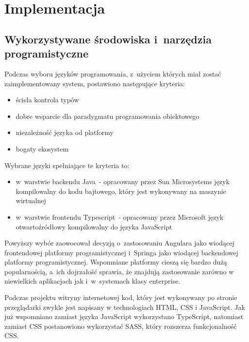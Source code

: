 \chapter{Implementacja}\label{ch:implementation}
\section{Wykorzystywane środowiska i~narzędzia programistyczne}\label{sec:dev-tools}

Podczas wyboru języków programowania, z~użyciem których miał zostać zaimplementowany system, postawiono następujące kryteria:

\begin{itemize}
    \item ścisła kontrola typów
    \item dobre wsparcie dla paradygmatu programowania obiektowego
    \item niezależność języka od platformy
    \item bogaty ekosystem
\end{itemize}

Wybrane języki spełniające te kryteria to:

\begin{itemize}
    \item w~warstwie backendu Java\cite{tech:java}~- opracowany przez Sun Microsystems język kompilowalny do kodu bajtowego, który jest wykonywany na maszynie wirtualnej
    \item w~warstwie frontendu Typescript\cite{tech:typescript}~- opracowany przez Microsoft język otwartoźródłowy kompilowalny do języka JavaScript\cite{tech:javascript}
\end{itemize}

Powyższy wybór zaowocował decyzją o~zastosowaniu Angulara\cite{tech:angular} jako wiodącej frontendowej platformy programistycznej
i~Springa\cite{tech:spring} jako wiodącej backendowej platformy programistycznej.
Wspomniane platformy cieszą się bardzo dużą popularnością, a~ich dojrzałość sprawia,
że znajdują zastosowanie zarówno w niewielkich aplikacjach jak i~w~systemach klasy enterprise.

\par
Podczas projektu witryny internetowej kod, który jest wykonywany po stronie przeglądarki zwykle jest napisany w technologiach HTML, CSS\cite{tech:html-css} i JavaScript\cite{tech:javascript}.
Jak już wspomniano zamiast języka JavaScript wykorzystano TypeScript, natomiast zamiast CSS postanowiono wykorzystać SASS\cite{tech:sass}, który rozszerza funkcjonalność CSS.


